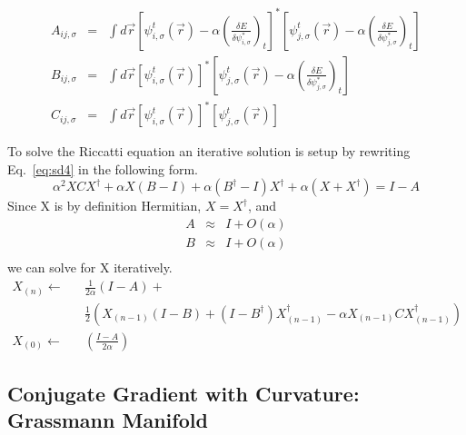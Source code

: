 \begin{eqnarray}
A_{ij,\sigma} &=& \int d\vec{r} 
             \left[\psi_{i,\sigma}^{t}(\vec{r}) 
                   - \alpha 
                     \left( \frac{\delta E}{\delta \psi_{i,\sigma}^{*}} 
                     \right)_t
             \right]^{*} 
             \left[\psi_{j,\sigma}^{t}(\vec{r}) 
                   - \alpha 
                     \left( \frac{\delta E}{\delta \psi_{j,\sigma}^{*}}
                     \right)_t
             \right] \\
B_{ij,\sigma} &=& \int d\vec{r} 
             \left[\psi_{i,\sigma}^{t}(\vec{r}) 
             \right]^{*} 
             \left[\psi_{j,\sigma}^{t}(\vec{r}) 
                   - \alpha 
                     \left( \frac{\delta E}{\delta \psi_{j,\sigma}^{*}}
                     \right)_t
             \right] \\
C_{ij,\sigma} &=& \int d\vec{r} 
             \left[\psi_{i,\sigma}^{t}(\vec{r}) 
             \right]^{*} 
             \left[\psi_{j,\sigma}^{t}(\vec{r}) 
             \right]
\end{eqnarray}

\noindent
To solve the Riccatti equation an iterative solution is setup by rewriting
Eq.~\ref{eq:sd4} in the following form.
\begin{equation}
\alpha^2 XCX^{\dag} + \alpha X(B-I) + \alpha (B^{\dag}-I)X^{\dag} 
 + \alpha(X + X^{\dag}) = I-A
\end{equation}
Since X is by definition Hermitian, $X=X^{\dag}$, and 
\begin{eqnarray}
A  &\approx& I + O(\alpha) \nonumber \\
B  &\approx& I + O(\alpha)  \\
\end{eqnarray}
we can solve for X iteratively.
\begin{eqnarray}
\label{eq:sd15}
X_{(n)} \leftarrow && \frac{1}{2 \alpha}(I-A) + \nonumber \\
                   && \frac{1}{2} \left( X_{(n-1)}(I-B)
                    + (I-B^{\dag})X_{(n-1)}^{\dag}
                    - \alpha X_{(n-1)}CX_{(n-1)}^{\dag} \right)  \\
\label{eq:sd16}
X_{(0)} \leftarrow && \left(\frac{I-A}{2 \alpha}\right)
\end{eqnarray}


\subsection{Conjugate Gradient with Curvature: Grassmann Manifold}
\label{sec:pspw_cgmanifold}

